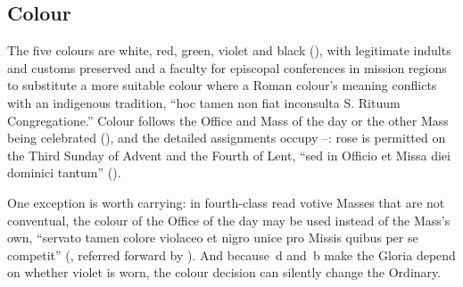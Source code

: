 \subsection{Colour}

The five colours are white, red, green, violet and black (), with
legitimate indults and customs preserved and a faculty for episcopal
conferences in mission regions to substitute a more suitable colour where a
Roman colour's meaning conflicts with an indigenous tradition, ``hoc tamen non
fiat inconsulta S. Rituum Congregatione.'' Colour follows the Office and Mass
of the day or the other Mass being celebrated (), and the detailed
assignments occupy --: rose is permitted on the Third Sunday
of Advent and the Fourth of Lent, ``sed in Officio et Missa diei dominici
tantum'' ().

One exception is worth carrying: in fourth-class read votive Masses that are
not conventual, the colour of the Office of the day may be used instead of the
Mass's own, ``servato tamen colore violaceo et nigro unice pro Missis quibus
per se competit'' (, referred forward by ). And because
\,d and \,b make the Gloria depend on whether violet is
worn, the colour decision can silently change the Ordinary.
